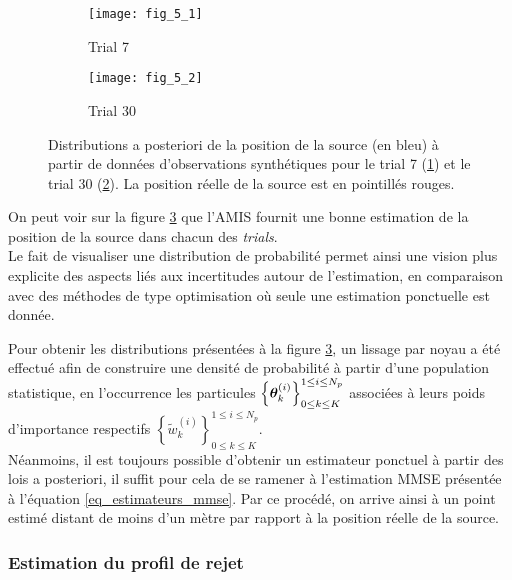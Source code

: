 { \begin{figure}[h!]
 	\centering
 	\begin{subfigure}[t]{1\textwidth}
 		\centering
 		\texttt{[image: fig\_5\_1]}
 		\caption{Trial 7}
 		\label{fig_5_1_AE}
 	\end{subfigure}
 	\begin{subfigure}[t]{1\textwidth}
 		\centering
 		\texttt{[image: fig\_5\_2]}
 		\caption{Trial 30}
 		\label{fig_5_2_AE}
 	\end{subfigure}
 	\caption{Distributions a posteriori de la position de la source (en bleu) à partir de données d'observations synthétiques pour le trial 7 (\ref{fig_5_1_AE}) et le trial 30 (\ref{fig_5_2_AE}). La position réelle de la source est en pointillés rouges.}
 	\label{fig_5_AE}
 \end{figure}
 On peut voir sur la figure \ref{fig_5_AE} que l'AMIS fournit une bonne estimation de la position de la source dans chacun des \textit{trials}.\\
 
  Le fait de visualiser une distribution de probabilité permet ainsi une vision plus explicite des aspects liés aux incertitudes autour de l'estimation,  en comparaison avec des méthodes de type optimisation où seule une estimation ponctuelle est donnée.
  
  Pour obtenir les distributions présentées à la figure \ref{fig_5_AE}, {un lissage par noyau} a été effectué afin de construire une densité de probabilité à partir d'une population statistique, en l'occurrence les particules $\left\{{\bm{\theta}}_k^{(i)}\right\}_{0\leq k \leq K}^{1\leq i \leq N_p}$ associées à leurs poids d'importance respectifs $\left\{\widetilde{w}_k^{(i)}\right\}_{0\leq k \leq K}^{1\leq i \leq N_p}$. \\
  
  
  Néanmoins, il est toujours possible d'obtenir un estimateur ponctuel à partir des lois a posteriori, il suffit pour cela de se ramener à l'estimation MMSE présentée à l'équation \eqref{eq_estimateurs_mmse}. Par ce procédé, on arrive ainsi à un point estimé distant de moins d'un mètre par rapport à la position réelle de la source. \\

  \subsubsection{Estimation du profil de rejet}
  
  }
